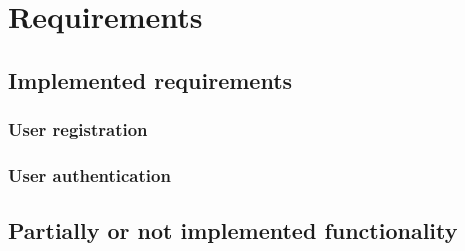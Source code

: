 \documentclass[../ITD.tex]{subfiles}
\begin{document}
    \chapter{Requirements}\label{ch:requirements}
    \section{Implemented requirements}\label{sec:implemented-requirements}
    \subsection{User registration}\label{subsec:user-registration}
    \subsection{User authentication}\label{subsec:user-authentication}
    \section{Partially or not implemented functionality}\label{sec:partially-or-not-implemented-funcionality}
\end{document}
